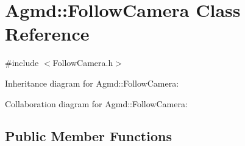 \hypertarget{class_agmd_1_1_follow_camera}{\section{Agmd\+:\+:Follow\+Camera Class Reference}
\label{class_agmd_1_1_follow_camera}
}


{\ttfamily \#include $<$Follow\+Camera.\+h$>$}



Inheritance diagram for Agmd\+:\+:Follow\+Camera\+:


Collaboration diagram for Agmd\+:\+:Follow\+Camera\+:
\subsection*{Public Member Functions}
